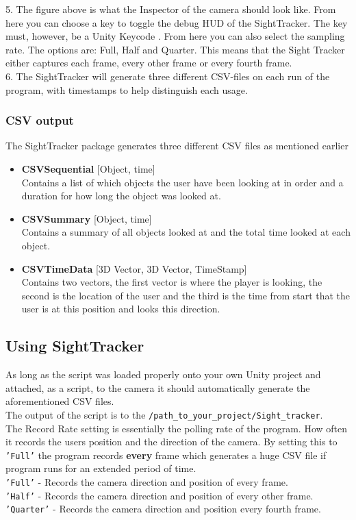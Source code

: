 \documentclass[letterpaper]{article}
\begin{document}
\begin{itemize}
5. The figure above is what the Inspector of the camera should look like. From here you can choose a key to toggle the debug HUD of the SightTracker. The key must, however, be a Unity Keycode \cite{unitykeycode}. From here you can also select the sampling rate. The options are: Full, Half and Quarter. This means that the Sight Tracker either captures each frame, every other frame or every fourth frame.\\[0.15in]
6. The SightTracker will generate three different CSV-files on each run of the program, with timestamps to help distinguish each usage.
\end{itemize}
\subsubsection{CSV output}
The SightTracker package generates three different CSV files as mentioned earlier\\
\begin{itemize}
\item \textbf{CSVSequential} [Object, time]\\
Contains a list of which objects the user have been looking at in order and a duration for how long the object was looked at.
\item \textbf{CSVSummary} [Object, time]\\
Contains a summary of all objects looked at and the total time looked at each object.
\item \textbf{CSVTimeData} [3D Vector, 3D Vector, TimeStamp]\\
Contains two vectors, the first vector is where the player is looking, the second is the location of the user and the third is the time from start that the user is at this position and looks this direction.
\end{itemize}
\pagebreak
\subsection{Using SightTracker}
As long as the script was loaded properly onto your own Unity project and attached, as a script, to the camera it should automatically generate the aforementioned CSV files.\\
The output of the script is to the \texttt{/path\_to\_your\_project/Sight\_tracker}.\\
The Record Rate setting is essentially the polling rate of the program. How often it records the users position and the direction of the camera. By setting this to \texttt{'Full'} the program records \textbf{every} frame which generates a huge CSV file if program runs for an extended period of time.\\[0.15in]
\texttt{'Full'} - Records the camera direction and position of every frame.\\
\texttt{'Half'} - Records the camera direction and position of every other frame.\\
\texttt{'Quarter'} - Records the camera direction and position every fourth frame.
\end{document}
